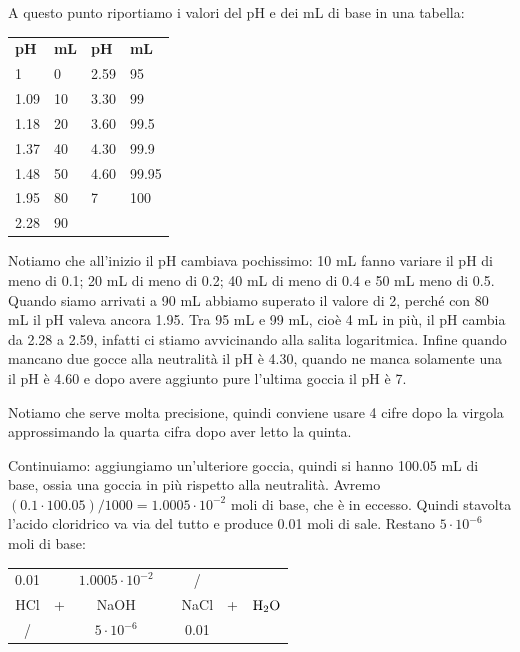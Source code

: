 A questo punto riportiamo i valori del pH e dei mL di base in una tabella:

\begin{center}
    \begin{tabular}{|p{1.5cm}|p{1.5cm}||p{1.5cm}|p{1.5cm}|}
        \textbf{pH} & \textbf{mL} & \textbf{pH} & \textbf{mL}\\
        1 & 0 & 2.59 & 95\\
        1.09 & 10 & 3.30 & 99\\
        1.18 & 20 & 3.60 & 99.5\\
        1.37 & 40 & 4.30 & 99.9\\
        1.48 & 50 & 4.60 & 99.95\\
        1.95 & 80 & 7 & 100\\
        2.28 & 90 &&\\
    \end{tabular}
\end{center}

Notiamo che all'inizio il pH cambiava pochissimo: 10 mL fanno variare il pH di meno di 0.1; 20 mL di meno di 0.2; 40 mL di meno di 0.4 e 50 mL meno di 0.5. Quando siamo arrivati a 90 mL abbiamo superato il valore di 2, perché con 80 mL il pH valeva ancora 1.95. Tra 95 mL e 99 mL, cioè 4 mL in più, il pH cambia da 2.28 a 2.59, infatti ci stiamo avvicinando alla salita logaritmica. Infine quando mancano due gocce alla neutralità il pH è 4.30, quando ne manca solamente una il pH è 4.60 e dopo avere aggiunto pure l'ultima goccia il pH è 7.

Notiamo che serve molta precisione, quindi conviene usare 4 cifre dopo la virgola approssimando la quarta cifra dopo aver letto la quinta.

Continuiamo: aggiungiamo un'ulteriore goccia, quindi si hanno 100.05 mL di base, ossia una goccia in più rispetto alla neutralità. Avremo $(0.1 \cdot 100.05)/1000=1.0005 \cdot 10^{-2}$ moli di base, che è in eccesso. Quindi stavolta l'acido cloridrico va via del tutto e produce 0.01 moli di sale. Restano $5 \cdot 10^{-6}$ moli di base:

\begin{center}
    \begin{tabular}{ccccccc}
        0.01 &  & $1.0005 \cdot 10^{-2}$ & & / & &\\
        HCl & + & NaOH & \ce{->} & NaCl & + & $\rm H_2O$\\
        / &  &  $5 \cdot 10^{-6}$ & & 0.01 & &\\
    \end{tabular}
\end{center}


